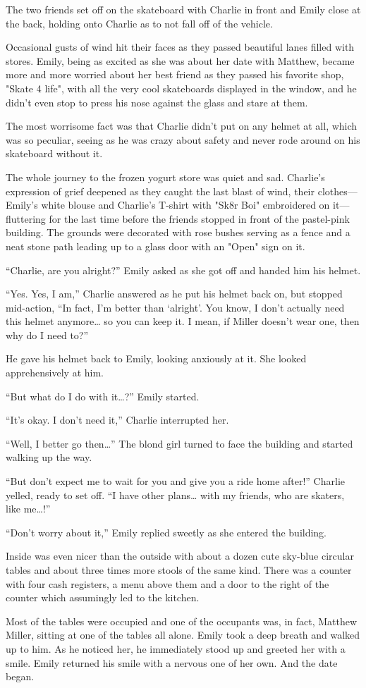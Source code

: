 The two friends set off on the skateboard with Charlie in front and Emily close at the back, holding onto Charlie as to not fall off of the vehicle.

Occasional gusts of wind hit their faces as they passed beautiful lanes filled with stores. Emily, being as excited as she was about her date with Matthew, became more and more worried about her best friend as they passed his favorite shop, "Skate 4 life", with all the very cool skateboards displayed in the window, and he didn't even stop to press his nose against the glass and stare at them.

The most worrisome fact was that Charlie didn't put on any helmet at all, which was so peculiar, seeing as he was crazy about safety and never rode around on his skateboard without it.

The whole journey to the frozen yogurt store was quiet and sad. Charlie's expression of grief deepened as they caught the last blast of wind, their clothes—Emily's white blouse and Charlie's T-shirt with "Sk8r Boi" embroidered on it—fluttering for the last time before the friends stopped in front of the pastel-pink building. The grounds were decorated with rose bushes serving as a fence and a neat stone path leading up to a glass door with an "Open" sign on it.

“Charlie, are you alright?” Emily asked as she got off and handed him his helmet.

“Yes. Yes, I am,” Charlie answered as he put his helmet back on, but stopped mid-action, “In fact, I'm better than ‘alright'. You know, I don't actually need this helmet anymore… so you can keep it. I mean, if Miller doesn't wear one, then why do I need to?”

He gave his helmet back to Emily, looking anxiously at it. She looked apprehensively at him.

“But what do I do with it…?” Emily started.

“It's okay. I don't need it,” Charlie interrupted her.

“Well, I better go then…” The blond girl turned to face the building and started walking up the way.

“But don't expect me to wait for you and give you a ride home after!” Charlie yelled, ready to set off. “I have other plans… with my friends, who are skaters, like me…!”

“Don't worry about it,” Emily replied sweetly as she entered the building.

Inside was even nicer than the outside with about a dozen cute sky-blue circular tables and about three times more stools of the same kind. There was a counter with four cash registers, a menu above them and a door to the right of the counter which assumingly led to the kitchen.

Most of the tables were occupied and one of the occupants was, in fact, Matthew Miller, sitting at one of the tables all alone. Emily took a deep breath and walked up to him. As he noticed her, he immediately stood up and greeted her with a smile. Emily returned his smile with a nervous one of her own. And the date began.